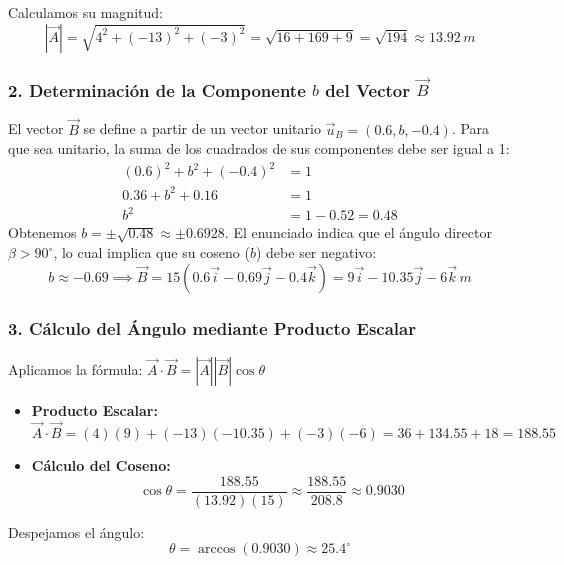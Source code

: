\documentclass[12pt, a4paper]{article}
\begin{document}
Calculamos su magnitud:
\begin{equation*}
    |\vec{A}| = \sqrt{4^2 + (-13)^2 + (-3)^2} = \sqrt{16 + 169 + 9} = \sqrt{194} \approx 13.92 \, \si{m}
\end{equation*}

\subsubsection*{2. Determinación de la Componente $b$ del Vector $\vec{B}$}
El vector $\vec{B}$ se define a partir de un vector unitario $\vec{u}_B = (0.6, b, -0.4)$. Para que sea unitario, la suma de los cuadrados de sus componentes debe ser igual a 1:
\begin{align*}
    (0.6)^2 + b^2 + (-0.4)^2 &= 1 \\
    0.36 + b^2 + 0.16 &= 1 \\
    b^2 &= 1 - 0.52 = 0.48
\end{align*}
Obtenemos $b = \pm \sqrt{0.48} \approx \pm 0.6928$. El enunciado indica que el ángulo director $\beta > 90^\circ$, lo cual implica que su coseno ($b$) debe ser negativo:
\begin{equation*}
    b \approx -0.69 \implies \vec{B} = 15(0.6\vec{i} - 0.69\vec{j} - 0.4\vec{k}) = 9\vec{i} - 10.35\vec{j} - 6\vec{k} \, \si{m}
\end{equation*}

\subsubsection*{3. Cálculo del Ángulo mediante Producto Escalar}
Aplicamos la fórmula: $\vec{A} \cdot \vec{B} = |\vec{A}| |\vec{B}| \cos \theta$
\begin{itemize}
    \item \textbf{Producto Escalar:} $\vec{A} \cdot \vec{B} = (4)(9) + (-13)(-10.35) + (-3)(-6) = 36 + 134.55 + 18 = 188.55$
    \item \textbf{Cálculo del Coseno:}
    $$ \cos \theta = \frac{188.55}{(13.92)(15)} \approx \frac{188.55}{208.8} \approx 0.9030 $$
\end{itemize}

Despejamos el ángulo:
\begin{equation*}
    \theta = \arccos(0.9030) \approx 25.4^\circ
\end{equation*}
\end{document}
